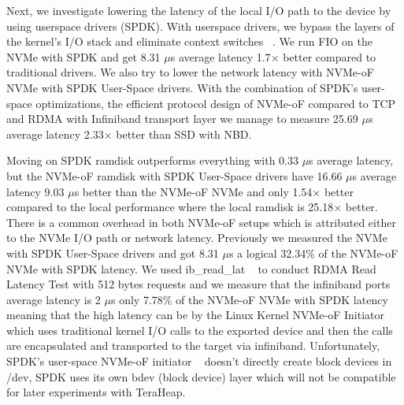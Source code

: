 Next, we investigate lowering the latency of the local I/O path to the device by using userspace drivers (SPDK). With userspace drivers, we bypass the layers of the kernel's I/O stack and eliminate context switches ~\cite{spdk}. We run FIO on the NVMe with SPDK and get 8.31 $\mu$s average latency 1.7$\times$ better compared to traditional drivers. We also try to lower
the network latency with NVMe-oF NVMe with SPDK User-Space drivers. With the combination of SPDK’s user-space optimizations, the efficient protocol design of NVMe-oF compared to TCP and RDMA with Infiniband transport layer we manage to measure 25.69 $\mu$s average latency 2.33$\times$ better than SSD with NBD. 

Moving on SPDK ramdisk outperforms everything with 0.33 $\mu$s average latency,
but the NVMe-oF ramdisk with SPDK User-Space drivers have 16.66 $\mu$s average
latency 9.03 $\mu$s better than the NVMe-oF NVMe and only 1.54$\times$ better
compared to the local performance where the local ramdisk is 25.18$\times$
better. There is a common overhead in both NVMe-oF setups which is attributed
either to the NVMe I/O path or network latency. Previously we measured the NVMe
with SPDK User-Space drivers and got 8.31 $\mu$s a logical 32.34\% of the
NVMe-oF NVMe with SPDK latency. We used ib\_read\_lat ~\cite{perftest} to
conduct RDMA Read Latency Test with 512 bytes requests and we measure that the
infiniband ports average latency is 2 $\mu$s only 7.78\% of the NVMe-oF NVMe
with SPDK latency meaning that the high latency can be by the Linux Kernel
NVMe-oF Initiator which uses traditional kernel I/O calls to the exported device
and then the calls are encapsulated and transported to the target via
infiniband. Unfortunately, SPDK's user-space NVMe-oF initiator ~\cite{spdk}
doesn't directly create block devices in /dev, SPDK uses its own bdev (block
device) layer which will not be compatible for later experiments with TeraHeap. 

